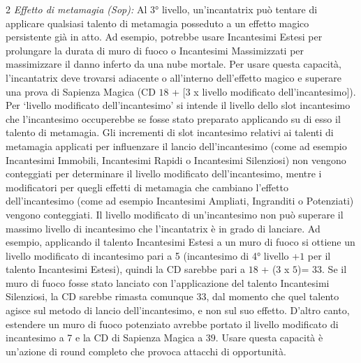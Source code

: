 \documentclass[10pt, a4paper]{report}
\begin{document}
\begin{multicols}{2}
\textit{Effetto di metamagia (Sop):} Al 3° livello, un'incantatrix può tentare di applicare qualsiasi talento di metamagia posseduto a un effetto magico persistente già in atto. Ad esempio, potrebbe usare Incantesimi Estesi per prolungare la durata di muro di fuoco o Incantesimi Massimizzati per massimizzare il danno inferto da una nube mortale. Per usare questa capacità, l'incantatrix deve trovarsi adiacente o all'interno dell'effetto magico e superare una prova di Sapienza Magica (CD $18$ + [$3$ x livello modificato dell'incantesimo]). Per \enquote*{livello modificato dell'incantesimo} si intende il livello dello slot incantesimo che l'incantesimo occuperebbe se fosse stato preparato applicando su di esso il talento di metamagia. Gli incrementi di slot incantesimo relativi ai talenti di metamagia applicati per influenzare il lancio dell'incantesimo (come ad esempio Incantesimi Immobili, Incantesimi Rapidi o Incantesimi Silenziosi) non vengono conteggiati per determinare il livello modificato dell'incantesimo, mentre i modificatori per quegli effetti di metamagia che cambiano l'effetto dell'incantesimo (come ad esempio Incantesimi Ampliati, Ingranditi o Potenziati) vengono conteggiati. Il livello modificato di un'incantesimo non può superare il massimo livello di incantesimo che l'incantatrix è in grado di lanciare.
Ad esempio, applicando il talento Incantesimi Estesi a un muro di fuoco si ottiene un livello modificato di incantesimo pari a 5 (incantesimo di 4° livello +$1$ per il talento Incantesimi Estesi), quindi la CD sarebbe pari a $18$ + ($3$ x $5$)= $33$. Se il muro di fuoco fosse stato lanciato con l'applicazione del talento Incantesimi Silenziosi, la CD sarebbe rimasta comunque $33$, dal momento che quel talento agisce sul metodo di lancio dell'incantesimo, e non sul suo effetto. D'altro canto, estendere un muro di fuoco potenziato avrebbe portato il livello modificato di incantesimo a 7 e la CD di Sapienza Magica a $39$.
Usare questa capacità è un'azione di round completo che provoca attacchi di opportunità.


\end{multicols}
\end{document}
